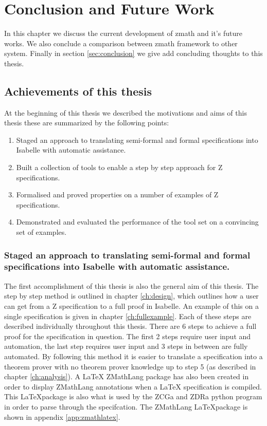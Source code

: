 \chapter{Conclusion and Future Work}
\label{ch:conclusion}

In this chapter we discuss the current development of \gls{zmath} and it's
future works. We also conclude a comparison between \gls{zmath} framework to
other system. Finally in section \ref{sec:conclusion} we give add concluding thoughts
to this thesis.


\section{Achievements of this thesis}

At the beginning of this thesis we described the motivations and aims of this
thesis these are summarized by the following points:

\begin{enumerate}

\item Staged an approach to translating semi-formal and formal specifications 
into Isabelle with automatic assistance.

\item Built a collection of tools to enable a step by step approach for Z
specifications.

\item Formalised and proved properties on a number of examples of Z
specifications.

\item Demonstrated and evaluated the performance of the tool set on a convincing
 set of examples.

\end{enumerate}

\subsection{Staged an approach to translating semi-formal and formal
specifications into Isabelle with automatic assistance.}

The first accomplishment of this thesis is also the general aim of this thesis.
The step by step method is outlined in chapter \ref{ch:design}, which outlines
how a user can get from a Z specification to a full proof in Isabelle. An
example of this on a single specification is given in chapter
\ref{ch:fullexample}. Each of these steps are described individually throughout
this thesis. There are 6 steps to achieve a full proof for the specification in
question. The first 2 steps require user input and automation, the last step
requires user input and 3 steps in between are fully automated. By following
this method it is easier to translate a specification into a theorem prover with
no theorem prover knowledge up to step 5 (as described in chapter
\ref{ch:analysis}). A \LaTeX{} ZMathLang package has also been created in order
to display ZMathLang annotations when a \LaTeX{} specification is compiled. This
\LaTeX package is also what is used by the ZCGa and ZDRa python program in order
to parse through the specifcation. The ZMathLang \LaTeX package is shown in
appendix \ref{app:zmathlatex}.

